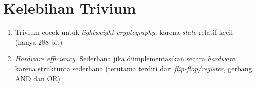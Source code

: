 \documentclass{article}
\begin{document}

\section*{Kelebihan Trivium}

\begin{enumerate}
    \item Trivium cocok untuk \textit{lightweight cryptography}, karena \textit{state} relatif kecil (hanya 288 bit)
    \item \textit{Hardware efficiency}. Sederhana jika diimplementasikan secara \textit{hardware}, karena struktunta sederhana (terutama terdiri dari \textit{flip-flop/register}, gerbang AND dan OR)
\end{enumerate}
\end{document}
